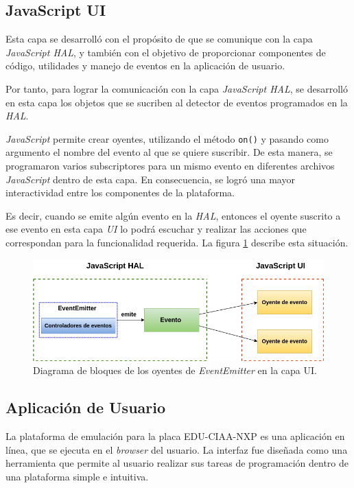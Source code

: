  
 \hfill \break
\hfill \break
\hfill \break
\hfill \break
\hfill \break

\subsection{JavaScript UI}

Esta capa se desarrolló con el propósito de que se comunique con la capa \textit{JavaScript HAL}, y también con el objetivo de proporcionar componentes de código, utilidades y manejo de eventos en la aplicación de usuario.

Por tanto, para lograr la comunicación con la capa \textit{JavaScript HAL}, se desarrolló en esta capa los objetos que se sucriben al detector de eventos programados en la \textit{HAL}.

\textit{JavaScript} permite crear oyentes, utilizando el método \texttt{on()} y pasando como argumento el nombre del evento al que se quiere suscribir. De esta manera, se  programaron varios subscriptores para un mismo evento en diferentes archivos \textit{JavaScript} dentro de esta capa. En consecuencia, se logró una mayor interactividad entre los componentes de la plataforma.

Es decir, cuando se emite algún evento en la \textit{HAL}, entonces el oyente suscrito a ese evento en esta capa \textit{UI} lo podrá escuchar y realizar las acciones que correspondan para la funcionalidad requerida. La figura \ref{fig:EventemitterNodeJSUI} describe esta situación.


\begin{figure}[ht]
	\centering
	\includegraphics[scale=.51]{./Figures/EventemitterNodeJSUI.png}
	\caption{Diagrama de bloques de los oyentes de \textit{EventEmitter} en la capa UI.}
	\label{fig:EventemitterNodeJSUI}
\end{figure}




\subsection{Aplicación de Usuario}
La plataforma de emulación para la placa EDU-CIAA-NXP es una aplicación en línea, que se ejecuta en el \textit{browser} del usuario. La interfaz fue diseñada como una herramienta que permite al usuario realizar sus tareas de programación dentro de una plataforma simple e intuitiva.

